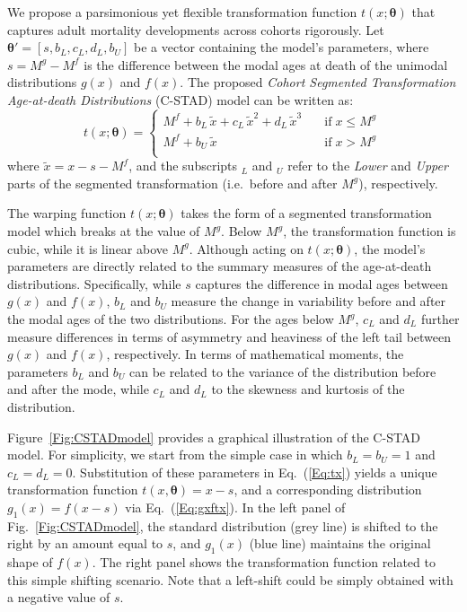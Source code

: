 \documentclass[11pt, a4paper]{article}
\begin{document}
We propose a parsimonious yet flexible transformation function $t(x;\bm{\theta})$ that captures adult mortality developments across cohorts rigorously. Let $\bm{\theta}' = \left[s,b_{L},c_{L},d_{L},b_{U}\right]$ be a vector containing the model's parameters, where $s = M^{g} - M^{f}$ is the difference between the modal ages at death of the unimodal distributions $g(x)$ and $f(x)$. The proposed \emph{Cohort Segmented Transformation Age-at-death Distributions} (C-STAD) model can be written as: 
\begin{equation}\label{Eq:tx}
t(x;\bm{\theta}) = \left\{ \begin{array}{ll}
M^{f} + b_{L}\,\tilde{x} + c_{L}\,\tilde{x}^2 + d_{L}\,\tilde{x}^3 \quad & \mathrm{if} \; x \leq M^{g} \, \\
M^{f} + b_{U}\,\tilde{x} \quad & \mathrm{if} \; x > M^{g} \\
\end{array}
\right.
\end{equation} 
where $\tilde{x}=x - s - M^{f}$, and the subscripts $_L$ and $_U$ refer to the \textit{Lower} and \textit{Upper} parts of the segmented transformation (i.e.~before and after $M^{g}$), respectively. \par

The warping function $t(x;\bm{\theta})$ takes the form of a segmented transformation model which breaks at the value of $M^{g}$. Below $M^{g}$, the transformation function is cubic, while it is linear above $M^{g}$. Although acting on $t(x;\bm{\theta})$, the model's parameters are directly related to the summary measures of the age-at-death distributions. Specifically, while $s$ captures the difference in modal ages between $g(x)$ and $f(x)$, $b_L$ and $b_U$ measure the change in variability before and after the modal ages of the two distributions. For the ages below $M^{g}$, $c_L$ and $d_L$ further measure differences in terms of asymmetry and heaviness of the left tail between $g(x)$ and $f(x)$, respectively. In terms of mathematical moments, the parameters $b_L$ and $b_U$ can be related to the variance of the distribution before and after the mode, while $c_L$ and $d_L$ to the skewness and kurtosis of the distribution. \par

Figure~\ref{Fig:CSTADmodel} provides a graphical illustration of the C-STAD model. For simplicity, we start from the simple case in which $b_L = b_U = 1$ and $c_L = d_L = 0$. Substitution of these parameters in Eq.~(\ref{Eq:tx}) yields a unique transformation function $t(x,\bm{\theta})=x-s$, and a corresponding distribution $g_1(x) = f(x-s)$ via Eq.~(\ref{Eq:gxftx}). In the left panel of Fig.~\ref{Fig:CSTADmodel}, the standard distribution (grey line) is shifted to the right by an amount equal to $s$, and $g_1(x)$ (blue line) maintains the original shape of $f(x)$. The right panel shows the transformation function related to this simple shifting scenario. Note that a left-shift could be simply obtained with a negative value of $s$. \par
\end{document}
